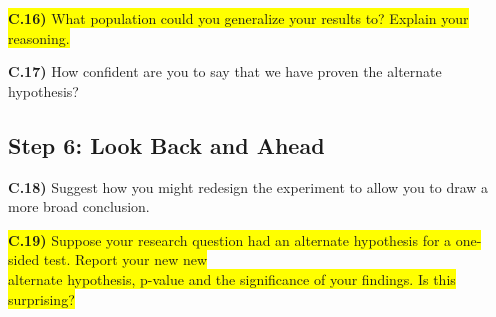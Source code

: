 \documentclass{article}
\newif\ifPrintSolution
\newcommand{\sol}[1]{\ifPrintSolution {\color{blue} #1 } \fi}
\begin{document}
\sol{No,  observational units from different regiments did not have an equal chance of being selected and so we cannot generalize these results to populations outside of 1st REG.}

\vspace{0.25in}

\colorbox{yellow}{\textbf{C.16)} What population could you generalize your results to? Explain your reasoning.}

\sol{We can generalize these results to the 1st Regiment population of cadets, as those cadets had an equal probability of being sampled for this study.}

\vspace{0.25in}


\textbf{C.17)} How confident are you to say that we have proven the alternate hypothesis?

\sol{We never say we proved or disproved a hypothesis, only that we have moderate evidence against the null hypothesis.}

\vspace{0.25in}


\subsection*{Step 6: Look Back and Ahead}

\textbf{C.18)} Suggest how you might redesign the experiment to allow you to draw a more broad conclusion.

\sol{To generalize to the corps of cadets, we would randomly sample from the entire population of the corps of cadets instead of just one regiment. To generalize to all cadets, we would need to be able to randomly sample from the Corps of Cadets, ROTC, and G2G populations with equal probability per cadet.}

\vspace{0.25in}

\colorbox{yellow}{\textbf{C.19)} Suppose your research question had an alternate hypothesis for a one-sided test. Report your new new } \\ \colorbox{yellow}{alternate hypothesis, p-value  and the significance of your findings. Is this surprising?}

\sol{$H_a: \mu > 480; \; \; \; 1 - pt(1.851943, 292)) = 0.03252164$\\
This is not surprising, it should be half the two-sided test, and $\frac{1}{2}$ of 0.065 is 0.0325}

\vspace{0.75in}
\end{document}
